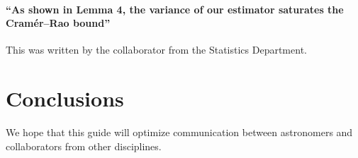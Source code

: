 \documentclass[12pt, preprint]{aastex}
\begin{document}
\paragraph{``As shown in Lemma 4, the variance of our estimator saturates
the Cram\'er--Rao bound''}
This was written by the collaborator from the Statistics Department.


\section{Conclusions}

We hope that this guide will optimize communication between astronomers
and collaborators from other disciplines.
\end{document}
